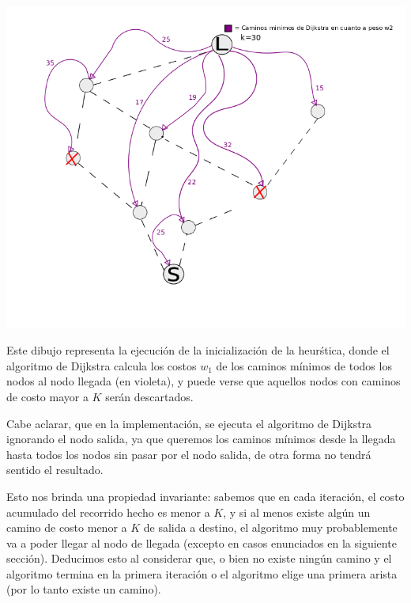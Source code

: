 \begin{center}
\includegraphics[scale=0.58]{img/inicializacion.png}
\end{center}	
\vspace{2mm}

Este dibujo representa la ejecuci\'on de la inicializaci\'on de la heur\'stica, donde el algoritmo de Dijkstra calcula los costos $w_1$ de los caminos m\'inimos de todos los nodos al nodo llegada (en violeta), y puede verse que aquellos nodos con caminos de costo mayor a $K$ ser\'an descartados.

\vspace{2mm}

Cabe aclarar, que en la implementaci\'on, se ejecuta el algoritmo de Dijkstra ignorando el nodo salida, ya que queremos los caminos m\'inimos desde la llegada hasta todos los nodos sin pasar por el nodo salida, de otra forma no tendr\'a sentido el resultado.

\vspace{2mm}

Esto nos brinda una propiedad invariante: sabemos que en cada iteraci\'on, el costo acumulado del recorrido hecho es menor a $K$, y si al menos existe alg\'un un camino de costo menor a $K$ de salida a destino, el algoritmo muy probablemente va a poder llegar al nodo de llegada (excepto en casos enunciados en la siguiente secci\'on). Deducimos esto al considerar que, o bien no existe ning\'un camino y  el algoritmo termina en la primera iteraci\'on o el algoritmo elige una primera arista (por lo tanto existe un camino). 

